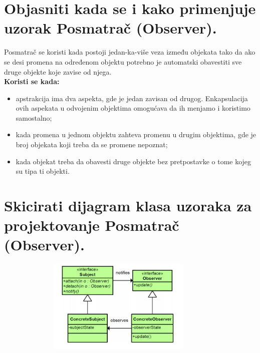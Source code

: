 \documentclass[a4paper]{article}
\begin{document}
\section{Objasniti kada se i kako primenjuje uzorak Posmatrač (Observer).}
  Posmatrač se koristi kada postoji jedan-ka-više veza između objekata tako da ako se desi promena 
  na određenom objektu potrebno je automatski obavestiti sve druge objekte koje zavise od njega.\\
  \textbf{Koristi se kada:}
  \begin{itemize}
    \item apstrakcija ima dva aspekta, gde je jedan zavisan od drugog. Enkapsulacija ovih aspekata
          u odvojenim objektima omogućava da ih menjamo i koristimo samostalno;
    \item kada promena u jednom objektu zahteva promenu u drugim objektima, gde je broj
          objekata koji treba da se promene nepoznat;
    \item kada objekat treba da obavesti druge objekte bez pretpostavke o tome kojeg su tipa ti objekti.
  \end{itemize}

\section{Skicirati dijagram klasa uzoraka za projektovanje Posmatrač (Observer).}
  \begin{figure}[H]
    \begin{center}
        \includegraphics[width=100mm,height=45mm]{Slike/dp_observer.png}
    \end{center}
  \end{figure} 
\end{document}
